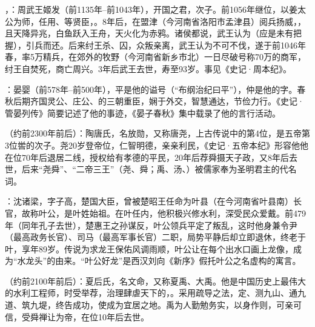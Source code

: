 ，：周武王姬发（前1135年--前1043年），开国之君，次子。前1056年继位，以姜太公为师，任用、等贤臣，。8年后，在盟津（今河南省洛阳市孟津县）阅兵扬威，，且天降异兆，白鱼跃入王舟，天火化为赤鸦。诸侯都说，武王认为（应是未有把握），引兵而还。后来纣王杀、囚，众叛亲离，武王认为不可不伐，遂于前1046年春，率5万精兵，在郊外的牧野（今河南省新乡市北）一日尽破号称70万的商军，纣王自焚死，商亡周兴。3年后武王去世，寿至93岁。事见《史记·周本纪》。

：晏婴（前578年--前500年），平是他的谥号（“布纲治纪曰平”），仲是他的字。春秋后期齐国灵公、庄公、的三朝重臣，娴于外交，智慧通达，节俭力行。《史记·管晏列传》简要记述了他的事迹，《晏子春秋》集中载录了他的言行活动。

（约前2300年前后）：陶唐氏，名放勋，又称唐尧，上古传说中的第4位，是五帝第3位喾的次子。尧20岁登帝位，仁智明德，亲亲利民，《史记·五帝本纪》形容他他在位70年后退居二线，授权给有孝德的平民，20年后荐舜摄天子政，又8年后去世，后来“尧舜”、“二帝三王”（尧、舜；禹、汤、）被儒家奉为圣明君主的代名词。

：沈诸梁，字子高，楚国大臣，曾被楚昭王任命为叶县（在今河南省叶县南）长官，故称叶公，是叶姓始祖。在叶任内，他积极兴修水利，深受民众爱戴。前479年（同年孔子去世），楚惠王之孙谋反，叶公领兵平定了叛乱，这时他身兼令尹（最高政务长官）、司马（最高军事长官）二职，局势平静后却立即退休，终老于叶，享年89岁。传说为求龙王保佑风调雨顺，叶公让在每个出水口画上龙像，成为“水龙头”的由来。“叶公好龙”是西汉刘向《新序》假托叶公之名虚构的寓言。

（约前2100年前后）：夏后氏，名文命，又称夏禹、大禹。他是中国历史上最伟大的水利工程师，时受举荐，治理肆虐天下的，。采用疏导之法，定、测九山、通九道、筑九堤，终告成功，使成为宜居之地。禹为人勤勉务实，以身作则，可亲可信，受舜禅让为帝，在位10年后去世。

